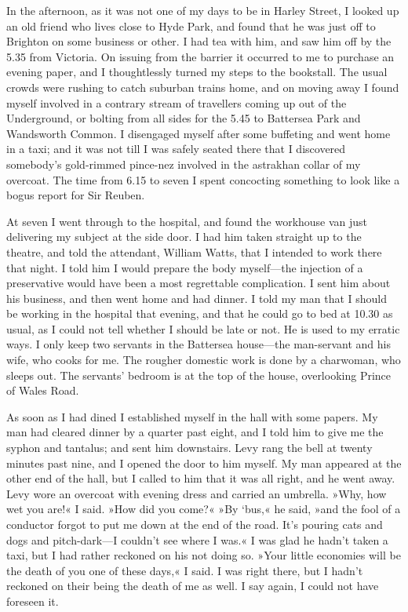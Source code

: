 In the afternoon, as it was not one of my days to be in Harley Street, I looked up an old friend who lives close to Hyde Park, and found that he was just off to Brighton on some business or other. I had tea with him, and saw him off by the 5.35 from Victoria. On issuing from the barrier it occurred to me to purchase an evening paper, and I thoughtlessly turned my steps to the bookstall. The usual crowds were rushing to catch suburban trains home, and on moving away I found myself involved in a contrary stream of travellers coming up out of the Underground, or bolting from all sides for the 5.45 to Battersea Park and Wandsworth Common. I disengaged myself after some buffeting and went home in a taxi; and it was not till I was safely seated there that I discovered somebody's gold-rimmed pince-nez involved in the astrakhan collar of my overcoat. The time from 6.15 to seven I spent concocting something to look like a bogus report for Sir Reuben.

At seven I went through to the hospital, and found the workhouse van just delivering my subject at the side door. I had him taken straight up to the theatre, and told the attendant, William Watts, that I intended to work there that night. I told him I would prepare the body myself—the injection of a preservative would have been a most regrettable complication. I sent him about his business, and then went home and had dinner. I told my man that I should be working in the hospital that evening, and that he could go to bed at 10.30 as usual, as I could not tell whether I should be late or not. He is used to my erratic ways. I only keep two servants in the Battersea house—the man-servant and his wife, who cooks for me. The rougher domestic work is done by a charwoman, who sleeps out. The servants' bedroom is at the top of the house, overlooking Prince of Wales Road.

As soon as I had dined I established myself in the hall with some papers. My man had cleared dinner by a quarter past eight, and I told him to give me the syphon and tantalus; and sent him downstairs. Levy rang the bell at twenty minutes past nine, and I opened the door to him myself. My man appeared at the other end of the hall, but I called to him that it was all right, and he went away. Levy wore an overcoat with evening dress and carried an umbrella. »Why, how wet you are!« I said. »How did you come?« »By `bus,« he said, »and the fool of a conductor forgot to put me down at the end of the road. It's pouring cats and dogs and pitch-dark—I couldn't see where I was.« I was glad he hadn't taken a taxi, but I had rather reckoned on his not doing so. »Your little economies will be the death of you one of these days,« I said. I was right there, but I hadn't reckoned on their being the death of me as well. I say again, I could not have foreseen it.

